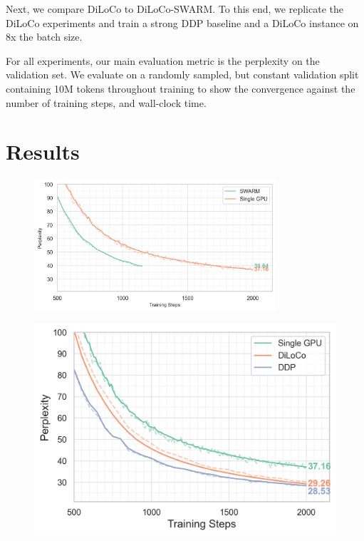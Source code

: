 \documentclass[conference, 10pt]{IEEEtran}
\begin{document}
Next, we compare DiLoCo to DiLoCo-SWARM. To this end, we replicate the DiLoCo
experiments and train a strong DDP baseline and a DiLoCo instance on 8x the
batch size. 



For all experiments, our main evaluation metric is the perplexity on the
validation set. We evaluate on a randomly sampled, but constant validation split
containing 10M tokens throughout training to show the convergence against the
number of training steps, and wall-clock time.

\section{Results}
\label{sec:results}

\begin{figure}[t!]
  \centering
  \includegraphics[width=0.8\textwidth]{figures/experiment1.png}
  \caption{}
  \label{fig:experiment1}
\end{figure}

\begin{figure}[t!]
  \centering
  \includegraphics[width=\linewidth]{figures/experiment2.png}
  \caption{}
  \label{fig:experiment2}
\end{figure}
\end{document}
